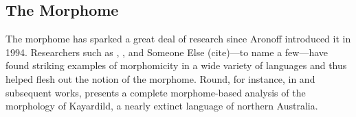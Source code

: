 %


\subsection{The Morphome}
\label{the-morphome}
The morphome has sparked a 
great deal of research since Aronoff introduced it in 1994. Researchers
such as \cite{maiden:2005, maiden:md:2016}, \cite{round:2009, round:2011, 
round:2012, round:2015, round:md:2016}, and Someone Else (cite)---to name 
a few---have found striking examples of morphomicity in a wide variety of 
languages and thus 
helped flesh out the notion of the morphome.
Round, for instance, in \cite{round:2009} and subsequent works, 
presents a complete 
morphome-based analysis of the morphology of Kayardild, a nearly extinct 
language of northern Australia. 
 
